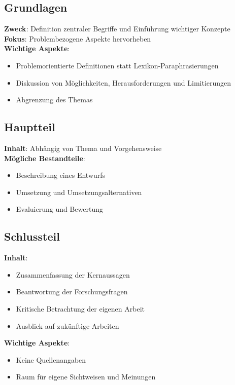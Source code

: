 \documentclass[a4paper,12pt]{article}
\begin{document}
\subsection{Grundlagen}
\textbf{Zweck}: Definition zentraler Begriffe und Einführung wichtiger Konzepte\\
\textbf{Fokus}: Problembezogene Aspekte hervorheben\\
\textbf{Wichtige Aspekte}:
\begin{itemize}
    \item Problemorientierte Definitionen statt Lexikon-Paraphrasierungen
    \item Diskussion von Möglichkeiten, Herausforderungen und Limitierungen
    \item Abgrenzung des Themas
\end{itemize}

\subsection{Hauptteil}
\textbf{Inhalt}: Abhängig von Thema und Vorgehensweise\\
\textbf{Mögliche Bestandteile}:
\begin{itemize}
    \item Beschreibung eines Entwurfs
    \item Umsetzung und Umsetzungsalternativen
    \item Evaluierung und Bewertung
\end{itemize}

\subsection{Schlussteil}
\textbf{Inhalt}:
\begin{itemize}
    \item Zusammenfassung der Kernaussagen
    \item Beantwortung der Forschungsfragen
    \item Kritische Betrachtung der eigenen Arbeit
    \item Ausblick auf zukünftige Arbeiten
\end{itemize}
\textbf{Wichtige Aspekte}:
\begin{itemize}
    \item Keine Quellenangaben
    \item Raum für eigene Sichtweisen und Meinungen
\end{itemize}
\end{document}
